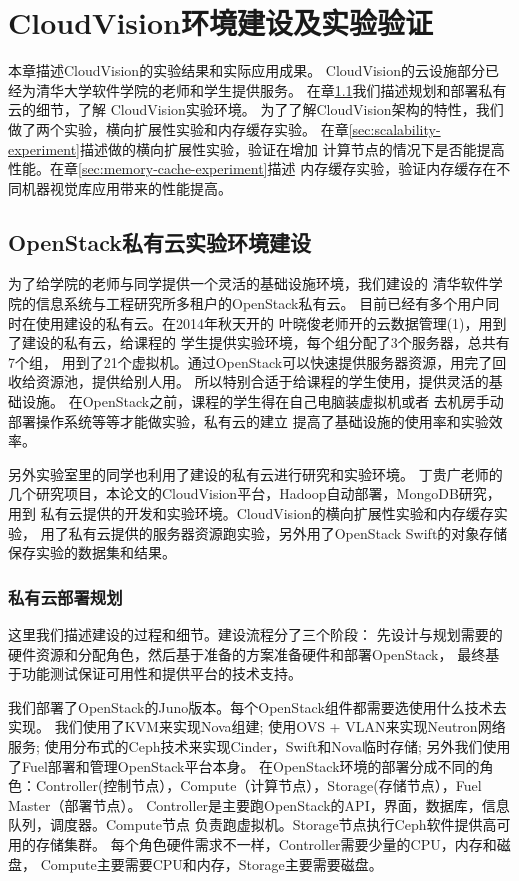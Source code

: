 \chapter{CloudVision环境建设及实验验证}
\label{cha:cloudvision_experiment}
本章描述CloudVision的实验结果和实际应用成果。
CloudVision的云设施部分已经为清华大学软件学院的老师和学生提供服务。
在章\ref{sec:priv-cloud-deployment}我们描述规划和部署私有云的细节，了解
CloudVision实验环境。
为了了解CloudVision架构的特性，我们做了两个实验，横向扩展性实验和内存缓存实验。
在章\ref{sec:scalability-experiment}描述做的横向扩展性实验，验证在增加
计算节点的情况下是否能提高性能。在章\ref{sec:memory-cache-experiment}描述
内存缓存实验，验证内存缓存在不同机器视觉库应用带来的性能提高。


\section{OpenStack私有云实验环境建设}
\label{sec:priv-cloud-deployment}
为了给学院的老师与同学提供一个灵活的基础设施环境，我们建设的
清华软件学院的信息系统与工程研究所多租户的OpenStack私有云。
目前已经有多个用户同时在使用建设的私有云。在2014年秋天开的
叶晓俊老师开的云数据管理(1)，用到了建设的私有云，给课程的
学生提供实验环境，每个组分配了3个服务器，总共有7个组，
用到了21个虚拟机。通过OpenStack可以快速提供服务器资源，用完了回收给资源池，提供给别人用。
所以特别合适于给课程的学生使用，提供灵活的基础设施。
在OpenStack之前，课程的学生得在自己电脑装虚拟机或者
去机房手动部署操作系统等等才能做实验，私有云的建立
提高了基础设施的使用率和实验效率。

另外实验室里的同学也利用了建设的私有云进行研究和实验环境。
丁贵广老师的几个研究项目，本论文的CloudVision平台，Hadoop自动部署，MongoDB研究，用到
私有云提供的开发和实验环境。CloudVision的横向扩展性实验和内存缓存实验，
用了私有云提供的服务器资源跑实验，另外用了OpenStack Swift的对象存储
保存实验的数据集和结果。

\subsection{私有云部署规划}
这里我们描述建设的过程和细节。建设流程分了三个阶段：
先设计与规划需要的硬件资源和分配角色，然后基于准备的方案准备硬件和部署OpenStack，
最终基于功能测试保证可用性和提供平台的技术支持。

我们部署了OpenStack的Juno版本。每个OpenStack组件都需要选使用什么技术去实现。
我们使用了KVM来实现Nova组建;
使用OVS + VLAN来实现Neutron网络服务;
使用分布式的Ceph技术来实现Cinder，Swift和Nova临时存储;
另外我们使用了Fuel部署和管理OpenStack平台本身。
在OpenStack环境的部署分成不同的角色：Controller(控制节点），Compute（计算节点），Storage(存储节点），Fuel Master（部署节点）。
Controller是主要跑OpenStack的API，界面，数据库，信息队列，调度器。Compute节点
负责跑虚拟机。Storage节点执行Ceph软件提供高可用的存储集群。
每个角色硬件需求不一样，Controller需要少量的CPU，内存和磁盘，
Compute主要需要CPU和内存，Storage主要需要磁盘。

